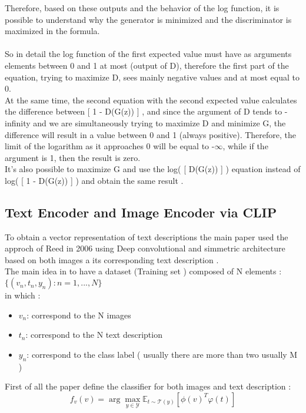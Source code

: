 Therefore, based on these outputs and the behavior of the log function, it is possible to understand why 
the generator is minimized and the discriminator is maximized in the formula.
\\\\
So in detail the log function of the first expected value must have as arguments elements between 0 and 1 at most 
(output of D), therefore the first part of the equation, trying to maximize D, sees mainly negative values and at 
most equal to 0. \\
At the same time, the second equation with the second expected value calculates the difference between [ 1 - D(G(z)) ] 
, and since the argument of D tends to -infinity and we are simultaneously trying to maximize D and minimize G, 
the difference will result in a value between 0 and 1 (always positive).
Therefore, the limit of the logarithm as it approaches 0 will be equal to -$\infty$, 
while if the argument is 1, then the result is zero. \\
It's also possible to maximize G and use the log( [ D(G(z)) ] ) equation instead of log( [ 1 - D(G(z)) ] ) and 
obtain the same result . 


\subsection*{
    Text Encoder and Image Encoder via CLIP
}
To obtain a vector representation of text descriptions the main paper used the approch 
of Reed in 2006 using Deep convolutional and simmetric architecture based on both 
images a its corresponding text description . \\
The main idea in to have a dataset (Training set ) composed of N elements : 
\\
$ \{(v_n, t_n, y_n) : n = 1, ..., N\} $
\\
in which :
\begin{itemize}
    \item $ v_n $: correspond to the N images
    \item $ t_n $: correspond to the N text description
    \item $ y_n $: correspond to the class label ( usually there are more than two usually M )
\end{itemize}

First of all the paper define the classifier for both images and text description :
\begin{equation}
    f_v(v) = \arg \max_{y \in \mathcal{Y}} \mathbb{E}_{t \sim \mathcal{T}(y)} [\phi(v)^T \varphi(t)]
\end{equation}
    
